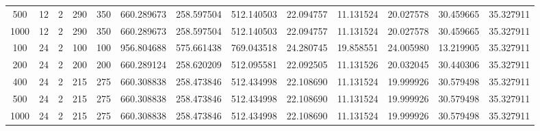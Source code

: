 \begin{table}[h]
\begin{tabular}{ccccccccccccc}
500 & 12 & 2 & 290 & 350 & 660.289673 & 258.597504 & 512.140503 & 22.094757 & 11.131524 & 20.027578 & 30.459665 & 35.327911 \\
1000 & 12 & 2 & 290 & 350 & 660.289673 & 258.597504 & 512.140503 & 22.094757 & 11.131524 & 20.027578 & 30.459665 & 35.327911 \\
100 & 24 & 2 & 100 & 100 & 956.804688 & 575.661438 & 769.043518 & 24.280745 & 19.858551 & 24.005980 & 13.219905 & 35.327911 \\
200 & 24 & 2 & 200 & 200 & 660.289124 & 258.620209 & 512.095581 & 22.092505 & 11.131526 & 20.032045 & 30.440306 & 35.327911 \\
400 & 24 & 2 & 215 & 275 & 660.308838 & 258.473846 & 512.434998 & 22.108690 & 11.131524 & 19.999926 & 30.579498 & 35.327911 \\
500 & 24 & 2 & 215 & 275 & 660.308838 & 258.473846 & 512.434998 & 22.108690 & 11.131524 & 19.999926 & 30.579498 & 35.327911 \\
1000 & 24 & 2 & 215 & 275 & 660.308838 & 258.473846 & 512.434998 & 22.108690 & 11.131524 & 19.999926 & 30.579498 & 35.327911 \\
\bottomrule
\end{tabular}
\end{table}
